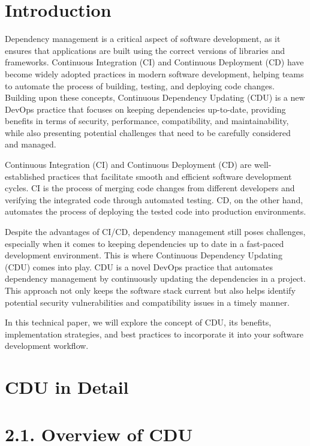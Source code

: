 \documentclass[10pt]{article}
\begin{document}
\section*{Introduction}

Dependency management is a critical aspect of software development, as it ensures that applications are built using the correct versions of libraries and frameworks. Continuous Integration (CI) and Continuous Deployment (CD) have become widely adopted practices in modern software development, helping teams to automate the process of building, testing, and deploying code changes. Building upon these concepts, Continuous Dependency Updating (CDU) is a new DevOps practice that focuses on keeping dependencies up-to-date, providing benefits in terms of security, performance, compatibility, and maintainability, while also presenting potential challenges that need to be carefully considered and managed.

Continuous Integration (CI) and Continuous Deployment (CD) are well-established practices that facilitate smooth and efficient software development cycles. CI is the process of merging code changes from different developers and verifying the integrated code through automated testing. CD, on the other hand, automates the process of deploying the tested code into production environments.

Despite the advantages of CI/CD, dependency management still poses challenges, especially when it comes to keeping dependencies up to date in a fast-paced development environment. This is where Continuous Dependency Updating (CDU) comes into play. CDU is a novel DevOps practice that automates dependency management by continuously updating the dependencies in a project. This approach not only keeps the software stack current but also helps identify potential security vulnerabilities and compatibility issues in a timely manner.

In this technical paper, we will explore the concept of CDU, its benefits, implementation strategies, and best practices to incorporate it into your software development workflow.

\section*{CDU in Detail}

\section*{2.1. Overview of CDU}
\end{document}
